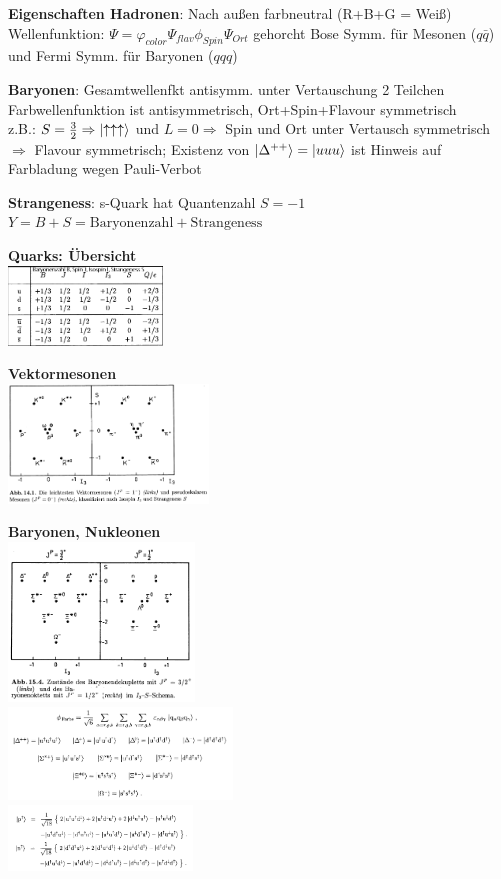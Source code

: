\documentclass[10pt,twoside,a4paper]{article}
\begin{document}
\begin{multicols*}{3}
\textbf{Eigenschaften Hadronen}: Nach außen farbneutral (R+B+G = Weiß) \\
Wellenfunktion: $\Psi = \varphi_{color} \Psi_{flav} \phi_{Spin} \Psi_{Ort}$ gehorcht Bose Symm. für Mesonen ($q\bar{q}$) und Fermi Symm. für Baryonen ($qqq$)

\textbf{Baryonen}: Gesamtwellenfkt antisymm. unter Vertauschung 2 Teilchen \\
Farbwellenfunktion ist antisymmetrisch, Ort+Spin+Flavour symmetrisch \\
z.B.: $S = \frac{3}{2} \Rightarrow \ket{\uparrow \uparrow \uparrow}$ und $L = 0 \Rightarrow$ Spin und Ort unter Vertausch symmetrisch $\Rightarrow$ Flavour symmetrisch; Existenz von $\ket{\Delta^{++}} = \ket{uuu}$ ist Hinweis auf Farbladung wegen Pauli-Verbot

\textbf{Strangeness}: s-Quark hat Quantenzahl $S = -1$ \\
$Y = B+S = \text{Baryonenzahl} + \text{Strangeness}$


\textbf{Quarks: Übersicht}\\
\includegraphics[width=.19\textwidth, height=60pt]{tab_quark}

\textbf{Vektormesonen}\\
\includegraphics[width=.33\textwidth, height=90pt]{mesonen}

\textbf{Baryonen, Nukleonen}\\
\includegraphics[width=.33\textwidth, height=120pt]{baryonen}\\
\includegraphics[width=.33\textwidth, height=70pt]{baryonen_2}\\
\includegraphics[width=.33\textwidth, height=50pt]{proton_neutron}


\end{multicols*}
\end{document}
